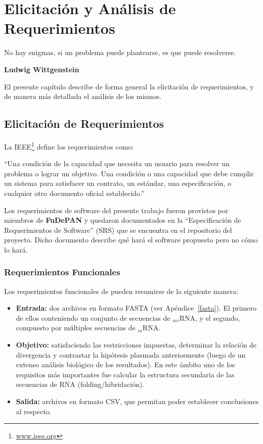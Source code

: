 \chapter{Elicitación y Análisis de Requerimientos}
\label{analisis}

\epigraph{No hay enigmas, si un problema puede plantearse, 
es que puede resolverse.}%
{\textbf{Ludwig Wittgenstein}}

\par El presente capítulo describe de forma general la elicitación de requerimientos, y de manera más detallada el análisis de los mismos.

\section{Elicitación de Requerimientos}
\par La IEEE\footnote{\url{www.ieee.org}} define los requerimientos como: 
\begin{center}
``Una condición de la capacidad que necesita un usuario para resolver un problema o lograr un objetivo. Una condición o una capacidad que debe cumplir un sistema para satisfacer un contrato, un estándar, una especificación, o cualquier otro documento oficial establecido.''
\end{center}
Los requerimientos de software del presente trabajo fueron provistos por miembros de \textbf{FuDePAN} y quedaron documentados en la ``Especificación de Requerimientos de Software'' (SRS) que se encuentra en el repositorio del proyecto. Dicho documento describe qué hará el software propuesto pero no cómo lo hará.

\subsection{Requerimientos Funcionales}
\label{reqFuncionales}
Los requerimientos funcionales de \remo pueden resumirse de la siguiente manera:

\begin{itemize}
	\item \textbf{Entrada:} dos archivos en formato FASTA (ver Apéndice~\ref{fasta}). El primero de ellos conteniendo un conjunto de secuencias de $_m$$_i$RNA, y el segundo, compuesto por múltiples secuencias de $_m$RNA.

	\item \textbf{Objetivo:} satisfaciendo las restricciones impuestas, determinar la relación de divergencia y contrastar la hipótesis plasmada anteriormente (luego de un extenso análisis biológico de los resultados). En este ámbito uno de los requisitos más importantes fue calcular la estructura secundaria de las secuencias de RNA (folding/hibridación).
							 
	\item \textbf{Salida:} archivos en formato CSV, que permitan poder establecer conclusiones al respecto. 
\end{itemize}

